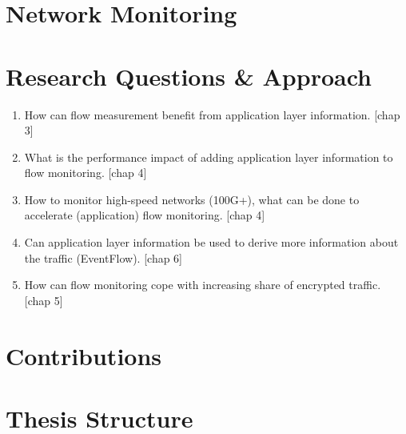 \section{Network Monitoring}



\section{Research Questions \& Approach}

\begin{enumerate}
	\item How can flow measurement benefit from application layer information. [chap 3]
	\item What is the performance impact of adding application layer information to flow monitoring. [chap 4]
	\item How to monitor high-speed networks (100G+), what can be done to accelerate (application) flow monitoring. [chap 4]
	\item Can application layer information be used to derive more information about the traffic (EventFlow). [chap 6]
	\item How can flow monitoring cope with increasing share of encrypted traffic. [chap 5]
\end{enumerate}


\section{Contributions}

\section{Thesis Structure}

